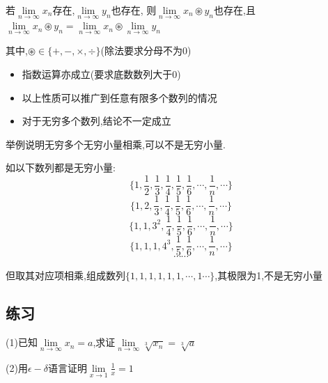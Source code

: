 \begin{theorem}[极限的四则运算]
    若$\lim \limits_{n \to \infty} x_n$存在,$\lim \limits_{n \to \infty} y_n$也存在,
    则$\lim \limits_{n \to \infty} x_n \circledast  y_n$也存在,且$\lim \limits_{n \to \infty} x_n \circledast  y_n = \lim \limits_{n \to \infty} x_n \circledast \lim \limits_{n \to \infty} y_n$

    \vspace{2pt}
    其中,$\circledast \in \{+,-,\times,\div \}$(除法要求分母不为0)
\end{theorem}

\begin{note}
    \begin{itemize}
        \item 指数运算亦成立(要求底数数列大于0)
        \item 以上性质可以推广到任意有限多个数列的情况
        \item 对于无穷多个数列,结论不一定成立
    \end{itemize}
\end{note}

\begin{example}
    举例说明无穷多个无穷小量相乘,可以不是无穷小量.
\end{example}

\begin{solution}

    如以下数列都是无穷小量:
    $$\{1,\frac{1}{2},\frac{1}{3},\frac{1}{4},\frac{1}{5},\frac{1}{6},\cdots,\frac{1}{n},\cdots\}$$
    $$\{1,2,\frac{1}{3},\frac{1}{4},\frac{1}{5},\frac{1}{6},\cdots,\frac{1}{n},\cdots\}$$
    $$\{1,1,3^2,\frac{1}{4},\frac{1}{5},\frac{1}{6},\cdots,\frac{1}{n},\cdots\}$$
    $$\{1,1,1,4^3,\frac{1}{5},\frac{1}{6},\cdots,\frac{1}{n},\cdots\}$$
    $$\cdots \cdots$$

    但取其对应项相乘,组成数列$\{1,1,1,1,1,1,\cdots,1\cdots\}$,其极限为1,不是无穷小量
\end{solution}

\subsection{练习}

\begin{exercise}

    (1)已知$\lim \limits_{n \to \infty} x_n = a$,求证$\lim \limits_{n \to \infty} \sqrt[3]{x_n}=\sqrt[3]{a} $

    (2)用$\epsilon-\delta$语言证明$\lim \limits_{x \to 1} \frac{1}{x}=1$
\end{exercise}

